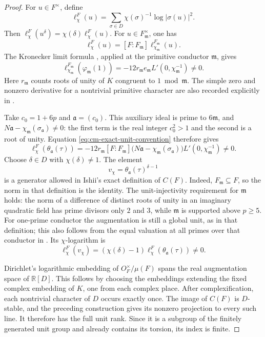 \begin{proof}
For \(u\in F^\times\), define
\[
 \ell_\chi^F(u)=
       \sum_{\sigma\in D}\chi(\sigma)^{-1}
                                    \log|\sigma(u)|^2.
\]
Then
\(\ell_\chi^F(u^\delta)=\chi(\delta)\ell_\chi^F(u)\).
For \(u\in F_{\mathfrak m}^\times\), one has
\[
 \ell_\chi^F(u)=[F:F_{\mathfrak m}]
                       \ell_{\chi_{\mathfrak m}}^{F_{\mathfrak m}}(u).
\]
The Kronecker limit formula
\cite[(6), p.~256]{Oukhaba2009}, applied at the primitive
conductor \(\mathfrak m\), gives
\[
 \ell_{\chi_{\mathfrak m}}^{F_{\mathfrak m}}
                         (\varphi_{\mathfrak m}(1))
   =-12r_{\mathfrak m}e_{\mathfrak m}
                          L'(0,\chi_{\mathfrak m}^{-1})\ne0 .
\]
Here \(r_{\mathfrak m}\) counts roots of unity of \(K\)
congruent to \(1\bmod\mathfrak m\).
The simple zero and nonzero derivative for a nontrivial primitive
character are also recorded explicitly in
\cite[\S2.3, p.~6, before (2.3)--(2.4)]{Oukhaba2003}.

Take \(c_0=1+6p\) and \(\mathfrak a=(c_0)\).
This auxiliary ideal is prime to \(6\mathfrak m\), and
\(N\mathfrak a-\chi_{\mathfrak m}(\sigma_{\mathfrak a})\ne0\):
the first term is the real integer \(c_0^2>1\) and the second
is a root of unity.
Equation \eqref{eq:cm-exact-unit-convention} therefore gives
\[
 \ell_\chi^F(\theta_{\mathfrak a}(\tau))
  =-12r_{\mathfrak m}[F:F_{\mathfrak m}]
    \bigl(N\mathfrak a-\chi_{\mathfrak m}(\sigma_{\mathfrak a})\bigr)
                         L'(0,\chi_{\mathfrak m}^{-1})\ne0.
\]
Choose \(\delta\in D\) with \(\chi(\delta)\ne1\).
The element
\[
                       v_\chi=\theta_{\mathfrak a}(\tau)^{\delta-1}
\]
is a generator allowed in Ishii's exact definition of \(C(F)\).
Indeed, \(F_{\mathfrak m}\subseteq F\), so the norm in that
definition is the identity.
The unit-injectivity requirement for \(\mathfrak m\) holds:
the norm of a difference of distinct roots of unity in an
imaginary quadratic field has prime divisors only \(2\) and \(3\),
while \(\mathfrak m\) is supported above \(p\geq5\).
For one-prime conductor the augmentation is still a global unit,
as in that definition; this also follows from the equal valuation
at all primes over that conductor in
\cite[(5), p.~256]{Oukhaba2009}.
Its \(\chi\)-logarithm is
\[
                \ell_\chi^F(v_\chi)
                   =(\chi(\delta)-1)
                      \ell_\chi^F(\theta_{\mathfrak a}(\tau))\ne0 .
\]

Dirichlet's logarithmic embedding of
\(O_F^\times/\mu(F)\) spans the real augmentation space of
\(\mathbb R[D]\).
This follows by choosing the embeddings extending the fixed
complex embedding of \(K\), one from each complex place.
After complexification, each nontrivial character of \(D\)
occurs exactly once.
The image of \(C(F)\) is \(D\)-stable, and the preceding
construction gives its nonzero projection to every such line.
It therefore has the full unit rank.
Since it is a subgroup of the finitely generated unit group
and already contains its torsion, its index is finite.


\end{proof}
